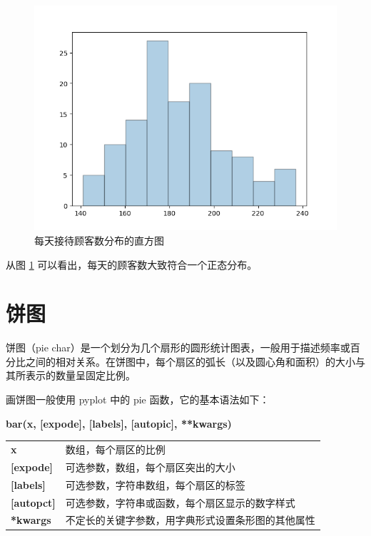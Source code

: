 \begin{figure}[!ht]
  \centering
  \includegraphics[scale=0.8]{figure/hist.png}
  \caption{每天接待顾客数分布的直方图}\label{fig:hist}
\end{figure}

从图 \ref{fig:hist} 可以看出，每天的顾客数大致符合一个正态分布。

\section{饼图}

饼图（pie char）是一个划分为几个扇形的圆形统计图表，一般用于描述频率或百分比之间的相对关系。在饼图中，每个扇区的弧长（以及圆心角和面积）的大小与其所表示的数量呈固定比例。

画饼图一般使用 pyplot 中的 pie 函数，它的基本语法如下：

\begin{center}
\begin{tcolorbox}[title = pie 函数的语法]
\textbf{bar(x, [expode], [labels], [autopic], **kwargs)}
\tcblower
\vspace{10pt}

\begin{tcboutputlisting}
\begin{tabular}{>{\bfseries}ll}
    x &数组，每个扇区的比例\\

    [expode] & 可选参数，数组，每个扇区突出的大小\\

  [labels] &可选参数，字符串数组，每个扇区的标签\\

  [autopct] &可选参数，字符串或函数，每个扇区显示的数字样式\\

**kwargs &不定长的关键字参数，用字典形式设置条形图的其他属性
\end{tabular}
\end{tcboutputlisting}
\tcbuselistingtext
\end{tcolorbox}
\end{center}

